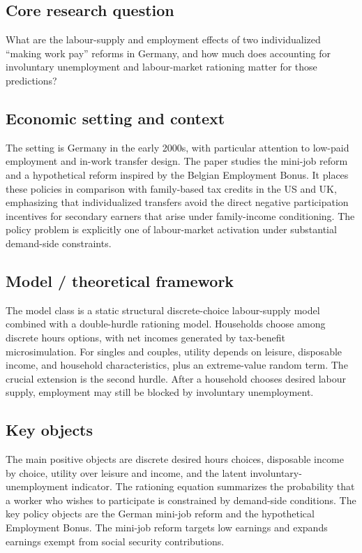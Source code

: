 \documentclass[11pt,a4paper]{article}
\begin{document}
\subsection*{Core research question}
What are the labour-supply and employment effects of two individualized “making work pay” reforms in Germany, and how much does accounting for involuntary unemployment and labour-market rationing matter for those predictions?

\subsection*{Economic setting and context}
The setting is Germany in the early 2000s, with particular attention to low-paid employment and in-work transfer design. The paper studies the mini-job reform and a hypothetical reform inspired by the Belgian Employment Bonus. It places these policies in comparison with family-based tax credits in the US and UK, emphasizing that individualized transfers avoid the direct negative participation incentives for secondary earners that arise under family-income conditioning. The policy problem is explicitly one of labour-market activation under substantial demand-side constraints.

\subsection*{Model / theoretical framework}
The model class is a static structural discrete-choice labour-supply model combined with a double-hurdle rationing model. Households choose among discrete hours options, with net incomes generated by tax-benefit microsimulation. For singles and couples, utility depends on leisure, disposable income, and household characteristics, plus an extreme-value random term. The crucial extension is the second hurdle. After a household chooses desired labour supply, employment may still be blocked by involuntary unemployment.

\subsection*{Key objects}
The main positive objects are discrete desired hours choices, disposable income by choice, utility over leisure and income, and the latent involuntary-unemployment indicator. The rationing equation summarizes the probability that a worker who wishes to participate is constrained by demand-side conditions. The key policy objects are the German mini-job reform and the hypothetical Employment Bonus. The mini-job reform targets low earnings and expands earnings exempt from social security contributions.
\end{document}
